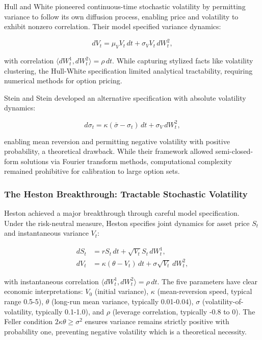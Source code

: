 \documentclass[12pt,a4paper]{article}
\begin{document}
Hull and White \cite{Hull1987} pioneered continuous-time stochastic volatility by permitting variance to follow its own diffusion process, enabling price and volatility to exhibit nonzero correlation. Their model specified variance dynamics:

\begin{equation}
dV_t = \mu_V V_t \, dt + \sigma_V V_t \, dW_t^2,
\end{equation}

with correlation $\langle dW_t^1, dW_t^2 \rangle = \rho \, dt$. While capturing stylized facts like volatility clustering, the Hull-White specification limited analytical tractability, requiring numerical methods for option pricing.

Stein and Stein \cite{SteinStein1991} developed an alternative specification with absolute volatility dynamics:

\begin{equation}
d\sigma_t = \kappa(\bar{\sigma} - \sigma_t) \, dt + \sigma_V \, dW_t^2,
\end{equation}

enabling mean reversion and permitting negative volatility with positive probability, a theoretical drawback. While their framework allowed semi-closed-form solutions via Fourier transform methods, computational complexity remained prohibitive for calibration to large option sets.

\subsubsection{The Heston Breakthrough: Tractable Stochastic Volatility}

Heston \cite{Heston1993} achieved a major breakthrough through careful model specification. Under the risk-neutral measure, Heston specifies joint dynamics for asset price $S_t$ and instantaneous variance $V_t$:

\begin{align}
dS_t &= r S_t \, dt + \sqrt{V_t} S_t \, dW_t^1, \\
dV_t &= \kappa (\theta - V_t) \, dt + \sigma \sqrt{V_t} \, dW_t^2,
\end{align}

with instantaneous correlation $\langle dW_t^1, dW_t^2 \rangle = \rho \, dt$. The five parameters have clear economic interpretations: $V_0$ (initial variance), $\kappa$ (mean-reversion speed, typical range 0.5-5), $\theta$ (long-run mean variance, typically 0.01-0.04), $\sigma$ (volatility-of-volatility, typically 0.1-1.0), and $\rho$ (leverage correlation, typically -0.8 to 0). The Feller condition $2\kappa\theta \geq \sigma^2$ ensures variance remains strictly positive with probability one, preventing negative volatility which is a theoretical necessity.
\end{document}
